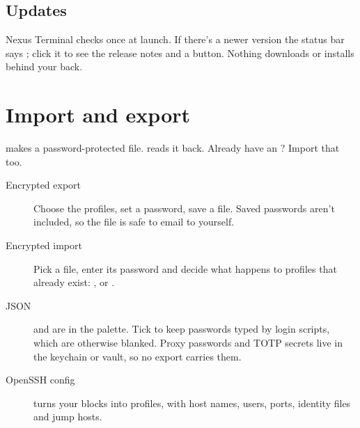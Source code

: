 
\section{Updates}

Nexus Terminal checks once at launch. If there's a newer version the status bar says ; click it to
see the release notes and a  button. Nothing downloads or installs behind your back.


\chapter{Import and export}\label{ch:transfer}

\begin{tldr}
 makes a password-protected  file. 
reads it back. Already have an ? Import that too.
\end{tldr}

\begin{description}
  \item[Encrypted export] Choose the profiles, set a password, save a  file. Saved passwords aren't
        included, so the file is safe to email to yourself.
  \item[Encrypted import] Pick a  file, enter its password and decide what happens to
        profiles that already exist: ,  or .
  \item[JSON]  and  are in the palette. Tick
         to keep passwords typed by login scripts, which are otherwise blanked. Proxy passwords and
        TOTP secrets live in the keychain or vault, so no export carries them.
  \item[OpenSSH config]  turns your  blocks into profiles,
        with host names, users, ports, identity files and jump hosts.
\end{description}

